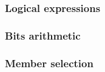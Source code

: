 \documentclass[a4paper,12pt]{article}
\begin{document}
\subsubsection{Logical expressions}


\subsubsection{Bits arithmetic}

\subsubsection{Member selection}
\end{document}
